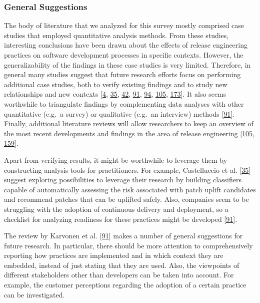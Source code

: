 \documentclass[]{book}
\begin{document}
\subsubsection{General Suggestions}\label{general-suggestions}

The body of literature that we analyzed for this survey mostly comprised
case studies that employed quantitative analysis methods. From these
studies, interesting conclusions have been drawn about the effects of
release engineering practices on software development processes in
specific contexts. However, the generalizability of the findings in
these case studies is very limited. Therefore, in general many studies
suggest that future research efforts focus on performing additional case
studies, both to verify existing findings and to study new relationships
and new contexts {[}\protect\hyperlink{ref-adams2016a}{4},
\protect\hyperlink{ref-castelluccio2017a}{35},
\protect\hyperlink{ref-claes2017a}{42},
\protect\hyperlink{ref-karvonen2017a}{91},
\protect\hyperlink{ref-khomh2015a}{94},
\protect\hyperlink{ref-laukkanen2018a}{105},
\protect\hyperlink{ref-teixeira2017a}{173}{]}. It also seems worthwhile
to triangulate findings by complementing data analyses with other
quantitative (e.g.~a survey) or qualitative (e.g.~an interview) methods
{[}\protect\hyperlink{ref-karvonen2017a}{91}{]}. Finally, additional
literature reviews will allow researchers to keep an overview of the
most recent developments and findings in the area of release engineering
{[}\protect\hyperlink{ref-laukkanen2018a}{105},
\protect\hyperlink{ref-rodriguez2017a}{159}{]}.

Apart from verifying results, it might be worthwhile to leverage them by
constructing analysis tools for practitioners. For example, Castelluccio
et al. {[}\protect\hyperlink{ref-castelluccio2017a}{35}{]} suggest
exploring possibilities to leverage their research by building
classifiers capable of automatically assessing the risk associated with
patch uplift candidates and recommend patches that can be uplifted
safely. Also, companies seem to be struggling with the adoption of
continuous delivery and deployment, so a checklist for analyzing
readiness for these practices might be developed
{[}\protect\hyperlink{ref-karvonen2017a}{91}{]}.

The review by Karvonen et al.
{[}\protect\hyperlink{ref-karvonen2017a}{91}{]} makes a number of
general suggestions for future research. In particular, there should be
more attention to comprehensively reporting how practices are
implemented and in which context they are embedded, instead of just
stating that they are used. Also, the viewpoints of different
stakeholders other than developers can be taken into account. For
example, the customer perceptions regarding the adoption of a certain
practice can be investigated.
\end{document}
